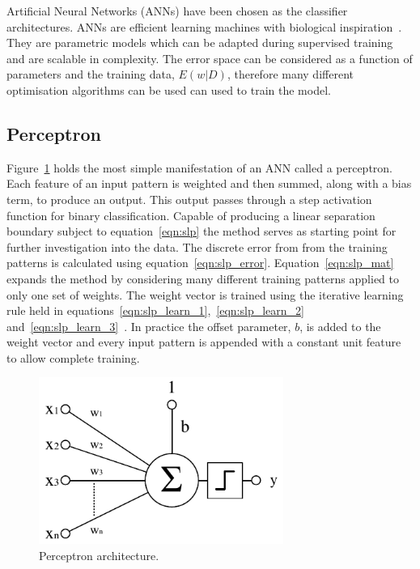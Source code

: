 \documentclass{ecsarticle}     %
\begin{document}
Artificial Neural Networks (ANNs) have been chosen as the classifier architectures.
ANNs are efficient learning machines with biological inspiration~\citep{bishop06pattern}. 
They are parametric models which can be adapted during supervised training and are scalable in complexity.
The error space can be considered as a function of parameters and the training data, $E(w|D)$, therefore many different optimisation algorithms can be used can used to train the model. 



\subsection{Perceptron}
\label{sec:perceptron}

Figure~\ref{fig:slp} holds the most simple manifestation of an ANN called a perceptron.
Each feature of an input pattern is weighted and then summed, along with a bias term, to produce an output.
This output passes through a step activation function for binary classification.
Capable of producing a linear separation boundary subject to equation~\eqref{eqn:slp} the method serves as starting point for further investigation into the data.
The discrete error from from the training patterns is calculated using equation~\eqref{eqn:slp_error}.
Equation~\eqref{eqn:slp_mat} expands the method by considering many different training patterns applied to only one set of weights.
The weight vector is trained using the iterative learning rule held in equations~\eqref{eqn:slp_learn_1},~\eqref{eqn:slp_learn_2} and~\eqref{eqn:slp_learn_3}~\citep{info05mackay}.
In practice the offset parameter, $b$, is added to the weight vector and every input pattern is appended with a constant unit feature to allow complete training.

\begin{figure}[ht]
   \centering
    \includegraphics[width = 8cm]{SLP.pdf}
   \caption{Perceptron architecture.}
   \label{fig:slp}
\end{figure}
\end{document}
